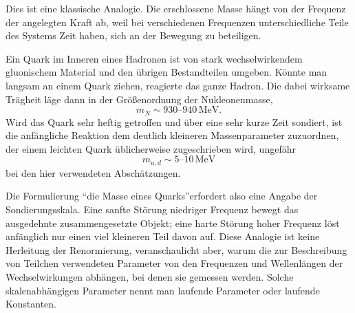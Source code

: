 Dies ist eine klassische Analogie. Die erschlossene Masse hängt von der Frequenz der angelegten Kraft ab, weil bei verschiedenen Frequenzen unterschiedliche Teile des Systems Zeit haben, sich an der Bewegung zu beteiligen.

Ein Quark im Inneren eines Hadronen ist von stark wechselwirkendem gluonischem Material und den übrigen Bestandteilen umgeben. Könnte man langsam an einem Quark ziehen, reagierte das ganze Hadron. Die dabei wirksame Trägheit läge dann in der Größenordnung der Nukleonenmasse,
\begin{equation}
m_N\sim930\text{--}940\,\mathrm{MeV}.
\end{equation}
Wird das Quark sehr heftig getroffen und über eine sehr kurze Zeit sondiert, ist die anfängliche Reaktion dem deutlich kleineren Massenparameter zuzuordnen, der einem leichten Quark üblicherweise zugeschrieben wird, ungefähr
\begin{equation}
m_{u,d}\sim5\text{--}10\,\mathrm{MeV}
\end{equation}
bei den hier verwendeten Abschätzungen.

Die Formulierung ``die Masse eines Quarks''erfordert also eine Angabe der Sondierungsskala. Eine sanfte Störung niedriger Frequenz bewegt das ausgedehnte zusammengesetzte Objekt; eine harte Störung hoher Frequenz löst anfänglich nur einen viel kleineren Teil davon auf. Diese Analogie ist keine Herleitung der Renormierung, veranschaulicht aber, warum die zur Beschreibung von Teilchen verwendeten Parameter von den Frequenzen und Wellenlängen der Wechselwirkungen abhängen, bei denen sie gemessen werden. Solche skalenabhängigen Parameter nennt man laufende Parameter oder laufende Konstanten.

\begin{classroomqa}
\end{classroomqa}

\begin{classroomqa}
\end{classroomqa}

